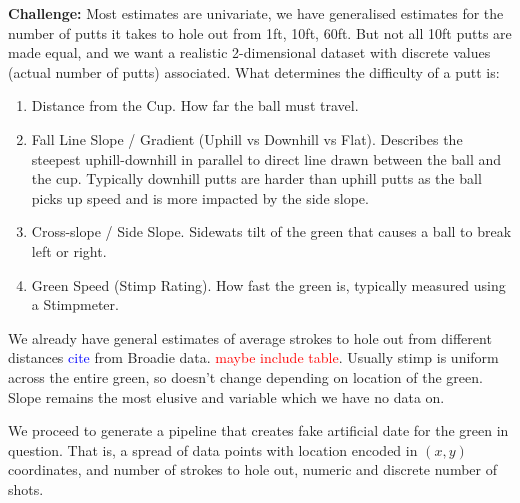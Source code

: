 \documentclass[11pt, letterpaper]{article}
\begin{document}
\textbf{Challenge:} Most estimates are univariate, we have generalised estimates for the number of putts it takes to hole out from 1ft, 10ft, 60ft. But not all 10ft putts are made equal, and we want a realistic 2-dimensional dataset with discrete values (actual number of putts) associated. What determines the difficulty of a putt is:
\begin{enumerate}
    \item Distance from the Cup. How far the ball must travel.
    \item Fall Line Slope / Gradient (Uphill vs Downhill vs Flat). Describes the steepest uphill-downhill in parallel to direct line drawn between the ball and the cup. Typically downhill putts are harder than uphill putts as the ball picks up speed and is more impacted by the side slope.
    \item Cross-slope / Side Slope. Sidewats tilt of the green that causes a ball to break left or right.
    \item Green Speed (Stimp Rating). How fast the green is, typically measured using a Stimpmeter. 
\end{enumerate}

We already have general estimates of average strokes to hole out from different distances \textcolor{blue}{cite} from Broadie data. \textcolor{red}{maybe include table}. Usually stimp is uniform across the entire green, so doesn't change depending on location of the green. Slope remains the most elusive and variable which we have no data on.

We proceed to generate a pipeline that creates fake artificial date for the green in question. That is, a spread of data points with location encoded in $(x,y)$ coordinates, and number of strokes to hole out, numeric and discrete number of shots.
\end{document}

